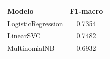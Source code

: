 \begin{tabular}{lc}
\toprule
Modelo & F1-macro \\
\midrule
LogisticRegression & 0.7354 \\
LinearSVC & 0.7482 \\
MultinomialNB & 0.6932 \\
\bottomrule
\end{tabular}
